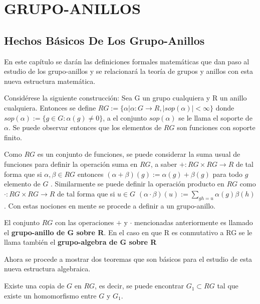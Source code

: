 \chapter{GRUPO-ANILLOS}

\section{Hechos Básicos De Los Grupo-Anillos}
En este capítulo se darán las definiciones formales matemáticas que dan paso al estudio de los grupo-anillos y se relacionará la teoría de grupos y anillos con esta nueva estructura matemática.

Considérese la siguiente construcción: Sea G un grupo cualquiera y R un anillo cualquiera. Entonces se define $RG:=\{\alpha | \alpha \colon  G \to R , |sop(\alpha)|< \infty \}$ donde $sop(\alpha):=\{g \in G: \alpha (g)\neq 0\}$, a el conjunto $sop(\alpha)$ se le llama el soporte de $\alpha$. Se puede observar entonces que los elementos de $RG$ son funciones con soporte finito. 

Como $RG$ es un conjunto de funciones, se puede considerar la suma usual de funciones para definir la operación suma en $RG$, a saber $+ \colon RG\times RG \to R $ de tal forma que si $\alpha, \beta \in RG$ entonces $(\alpha +\beta)(g):=\alpha(g)+\beta(g)$ para todo $g$ elemento de $G$ . Similarmente se puede definir la operación producto en $RG$ como $\cdot \colon RG \times RG \to R$ de tal forma que si $u\in G$ $(\alpha \cdot \beta )(u):= \sum_{gh=u}\alpha(g)\beta(h) $. Con estas nociones en mente   se procede a definir a un grupo-anillo.

\begin{definicion}
El conjunto $RG$ con las operaciones $+$ y $\cdot$ mencionadas anteriormente es llamado el \textbf{grupo-anillo de G sobre R}. En el caso en que R es conmutativo a RG se le llama también el \textbf{grupo-algebra de G sobre R} 
\end{definicion}

Ahora se procede a mostrar dos teoremas que son básicos para el estudio de esta nueva estructura algebraica.

\begin{teorema}
Existe una copia de $G$ en $RG$, es decir, se puede encontrar $G_1 \subset RG$ tal que existe  un homomorfismo entre $G$ y $G_1$.  
\end{teorema}

